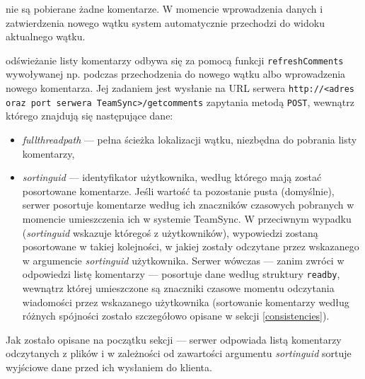 \documentclass[polish,a4paper,twoside]{ppfcmthesis}
\begin{document}
\begin{description}[noitemsep]
  \item[W widoku nowego wątku] nie są pobierane żadne komentarze. W momencie wprowadzenia danych i zatwierdzenia nowego wątku system automatycznie przechodzi do widoku aktualnego wątku.
  
  \item[W widoku aktualnego wątku] odświeżanie listy komentarzy odbywa się za pomocą funkcji \texttt{re\-freshComments} wywoływanej np. podczas przechodzenia do nowego wątku albo wprowadzenia nowego komentarza. Jej zadaniem jest wysłanie na URL serwera \texttt{http://<adres oraz port serwera TeamSync>\-/getcomments} zapytania metodą \texttt{POST}, wewnątrz którego znajdują się następujące dane:
  \begin{itemize}[noitemsep]
    \item \emph{fullthreadpath} --- pełna ścieżka lokalizacji wątku, niezbędna do pobrania listy komentarzy,
    \item \emph{sortinguid} --- identyfikator użytkownika, według którego mają zostać posortowane komentarze. Jeśli wartość ta pozostanie pusta (domyślnie), serwer posortuje komentarze według ich znaczników czasowych pobranych w momencie umieszczenia ich w systemie TeamSync. W przeciwnym wypadku (\emph{sortinguid} wskazuje któregoś z użytkowników), wypowiedzi zostaną posortowane w takiej kolejności, w jakiej zostały odczytane przez wskazanego w argumencie \emph{sortinguid} użytkownika. Serwer wówczas --- zanim zwróci w odpowiedzi listę komentarzy --- posortuje dane według struktury \texttt{readby}, wewnątrz której umieszczone są znaczniki czasowe momentu odczytania wiadomości przez wskazanego użytkownika (sortowanie komentarzy według różnych spójności zostało szczegółowo opisane w sekcji \ref{consistencies}).
  \end{itemize}
  Jak zostało opisane na początku sekcji --- serwer odpowiada listą komentarzy odczytanych z plików i w zależności od zawartości argumentu \emph{sortinguid} sortuje wyjściowe dane przed ich wysłaniem do klienta.


\end{description}
\end{document}
